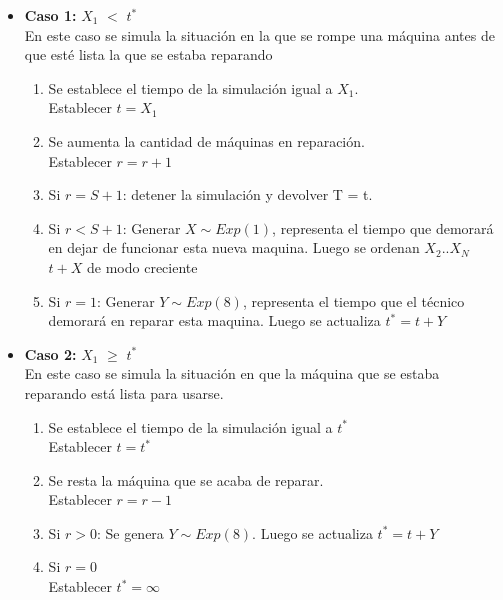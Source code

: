 \documentclass[11pt, spanish, a4paper]{article}
\begin{document}
\begin{itemize}
	\item \textbf{Caso 1: }$X_1$ $<$ $t^*$ \\
	En este caso se simula la situaci\'on en la que se rompe una m\'aquina antes de que est\'e lista la que se estaba reparando\\
	\begin{enumerate}
	

	\item Se establece el tiempo de la simulaci\'on igual a $X_1$.\\
	Establecer $t = X_1$\\
	\item Se aumenta la cantidad de m\'aquinas en reparaci\'on.\\
	Establecer $r = r+1$\\
	\item Si $ r = S+1$: detener la simulaci\'on y devolver T = t.\\
	\item Si $ r < S+1$: Generar $X \sim Exp(1)$, representa el tiempo que demorar\'a en dejar de funcionar esta nueva maquina. Luego se ordenan $X_2 .. X_N$ $t+X$ de modo creciente\\
	\item Si $ r = 1$: Generar $Y \sim Exp(8)$, representa el tiempo que el t\'ecnico demorar\'a en reparar esta maquina. Luego se actualiza $t^* = t + Y$ \\
	\end{enumerate}
	\item \textbf{Caso 2: } $X_1$ $\geq$ $t^*$\\
	
	En este caso se simula la situaci\'on en que la m\'aquina que se estaba reparando est\'a lista para usarse.
	\begin{enumerate}
	\item Se establece el tiempo de la simulaci\'on igual a $t^*$\\
	Establecer $t = t^*$
	\item Se resta la m\'aquina que se acaba de reparar.\\
	Establecer $r = r-1$
	\item Si $ r > 0$: Se genera $Y \sim Exp(8)$. Luego se actualiza $t^* = t + Y$
	\item Si $r = 0$ \\
	Establecer $t^* = \infty$
\end{enumerate}	
	
\end{itemize}
\end{document}
